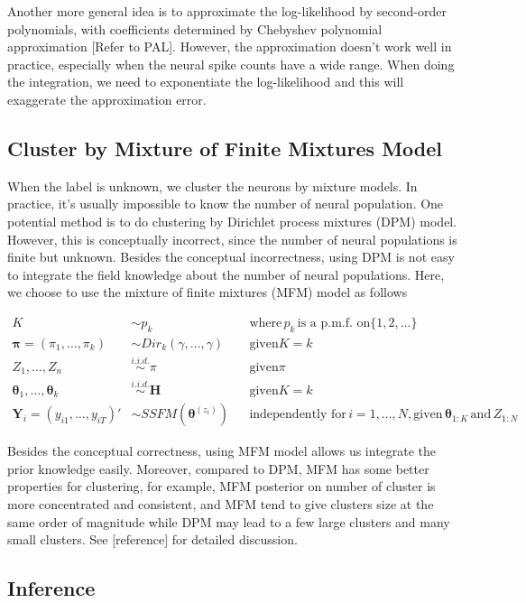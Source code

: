 \documentclass{article}
\begin{document}
	Another more general idea is to approximate the log-likelihood by second-order polynomials, with coefficients determined by Chebyshev polynomial approximation [Refer to PAL]. However, the approximation doesn’t work well in practice, especially when the neural spike counts have a wide range. When doing the integration, we need to exponentiate the log-likelihood and this will exaggerate the approximation error.
	
	\subsection{Cluster by Mixture of Finite Mixtures Model}
	When the label is unknown, we cluster the neurons by mixture models. In practice, it’s usually impossible to know the number of neural population. One potential method is to do clustering by Dirichlet process mixtures (DPM) model. However, this is conceptually incorrect, since the number of neural populations is finite but unknown. Besides the conceptual incorrectness, using DPM is not easy to integrate the field knowledge about the number of neural populations. Here, we choose to use the mixture of finite mixtures (MFM) model as follows
	
	\begin{align*}
		K &\sim p_k &&\text{where}\, p_k \, \text{is a p.m.f. on} \{1,2,\ldots\}\\
		\bm{\pi}=(\pi_1,\ldots,\pi_k) &\sim Dir_k(\gamma, \ldots,\gamma) &&\text{given} K=k\\
		Z_1,\ldots,Z_n&\stackrel{i.i.d.}{\sim}\pi &&\text{given} \pi\\
		\bm{\theta}_1,\ldots,\bm{\theta}_k&\stackrel{i.i.d.}{\sim}\bm{H} &&\text{given} K=k\\
		\bm{Y}_i = (y_{i1},\ldots,y_{iT})' &\sim SSFM(\bm{\theta}^{(z_i)}) &&\text{independently for}\, i=1,\ldots,N, \text{given}\, \bm{\theta}_{1:K}\, \text{and}\, Z_{1:N}
	\end{align*}
	
	Besides the conceptual correctness, using MFM model allows us integrate the prior knowledge easily. Moreover, compared to DPM, MFM has some better properties for clustering, for example, MFM posterior on number of cluster is more concentrated and consistent, and MFM tend to give clusters size at the same order of magnitude while DPM may lead to a few large clusters and many small clusters. See [reference] for detailed discussion. 
	
	\subsection{Inference}
	
\end{document}
